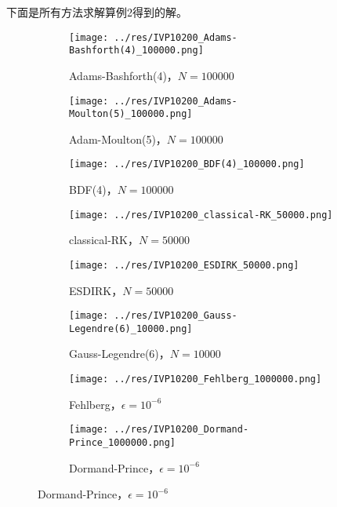 \documentclass[lang=cn,a4paper,newtx,bibend=bibtex]{elegantpaper}
\begin{document}
下面是所有方法求解算例2得到的解。
\begin{figure}[H]
    \centering
    \begin{subfigure}[b]{0.2\textwidth}
        \texttt{[image: ../res/IVP10200\_Adams-Bashforth(4)\_100000.png]}
        \caption{Adams-Bashforth(4)，$N=100000$}
    \end{subfigure}
    \hfill
    \begin{subfigure}[b]{0.2\textwidth}
        \texttt{[image: ../res/IVP10200\_Adams-Moulton(5)\_100000.png]}
        \caption{Adam-Moulton(5)，$N=100000$}
    \end{subfigure}
    \hfill
    \begin{subfigure}[b]{0.2\textwidth}
        \texttt{[image: ../res/IVP10200\_BDF(4)\_100000.png]}
        \caption{BDF(4)，$N=100000$}
    \end{subfigure}
    \hfill
    \begin{subfigure}[b]{0.2\textwidth}
        \texttt{[image: ../res/IVP10200\_classical-RK\_50000.png]}
        \caption{classical-RK，$N=50000$}
    \end{subfigure}
    \begin{subfigure}[b]{0.2\textwidth}
        \texttt{[image: ../res/IVP10200\_ESDIRK\_50000.png]}
        \caption{ESDIRK，$N=50000$}
    \end{subfigure}
    \hfill
    \begin{subfigure}[b]{0.2\textwidth}
        \texttt{[image: ../res/IVP10200\_Gauss-Legendre(6)\_10000.png]}
        \caption{Gauss-Legendre(6)，$N=10000$}
    \end{subfigure}
    \hfill
    \begin{subfigure}[b]{0.2\textwidth}
        \texttt{[image: ../res/IVP10200\_Fehlberg\_1000000.png]}
        \caption{Fehlberg，$\epsilon=10^{-6}$}
    \end{subfigure}
    \hfill
    \begin{subfigure}[b]{0.2\textwidth}
        \texttt{[image: ../res/IVP10200\_Dormand-Prince\_1000000.png]}
        \caption{Dormand-Prince，$\epsilon=10^{-6}$}
    \end{subfigure}
\end{figure}
\end{document}
